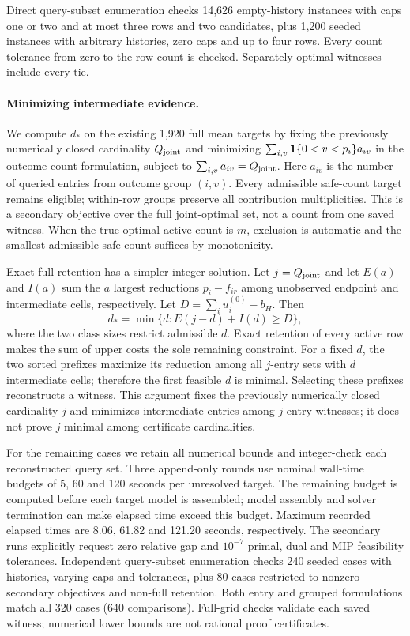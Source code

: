 Direct query-subset enumeration checks 14,626 empty-history instances with caps one or two and at most three rows and two candidates, plus 1,200 seeded instances with arbitrary histories, zero caps and up to four rows. Every count tolerance from zero to the row count is checked. Separately optimal witnesses include every tie.

\paragraph{Minimizing intermediate evidence.}
We compute $d_*$ on the existing 1,920 full mean targets by fixing the previously numerically closed cardinality $Q_{\rm joint}$ and minimizing $\sum_{i,v}\mathbf{1}\{0<v<p_i\}a_{iv}$ in the outcome-count formulation, subject to $\sum_{i,v}a_{iv}=Q_{\rm joint}$. Here $a_{iv}$ is the number of queried entries from outcome group $(i,v)$. Every admissible safe-count target remains eligible; within-row groups preserve all contribution multiplicities. This is a secondary objective over the full joint-optimal set, not a count from one saved witness. When the true optimal active count is $m$, exclusion is automatic and the smallest admissible safe count suffices by monotonicity.

Exact full retention has a simpler integer solution. Let $j=Q_{\rm joint}$ and let $E(a)$ and $I(a)$ sum the $a$ largest reductions $p_i-f_{ir}$ among unobserved endpoint and intermediate cells, respectively. Let $D=\sum_i u_i^{(0)}-b_H$. Then
\[
 d_*=\min\{d:E(j-d)+I(d)\ge D\},
\]
where the two class sizes restrict admissible $d$. Exact retention of every active row makes the sum of upper costs the sole remaining constraint. For a fixed $d$, the two sorted prefixes maximize its reduction among all $j$-entry sets with $d$ intermediate cells; therefore the first feasible $d$ is minimal. Selecting these prefixes reconstructs a witness. This argument fixes the previously numerically closed cardinality $j$ and minimizes intermediate entries among $j$-entry witnesses; it does not prove $j$ minimal among certificate cardinalities.

For the remaining cases we retain all numerical bounds and integer-check each reconstructed query set. Three append-only rounds use nominal wall-time budgets of 5, 60 and 120 seconds per unresolved target. The remaining budget is computed before each target model is assembled; model assembly and solver termination can make elapsed time exceed this budget. Maximum recorded elapsed times are 8.06, 61.82 and 121.20 seconds, respectively. The secondary runs explicitly request zero relative gap and $10^{-7}$ primal, dual and MIP feasibility tolerances. Independent query-subset enumeration checks 240 seeded cases with histories, varying caps and tolerances, plus 80 cases restricted to nonzero secondary objectives and non-full retention. Both entry and grouped formulations match all 320 cases (640 comparisons). Full-grid checks validate each saved witness; numerical lower bounds are not rational proof certificates.

